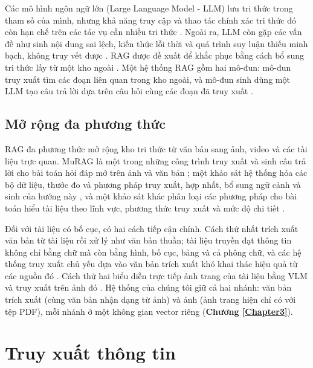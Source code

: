 Các mô hình ngôn ngữ lớn (Large Language Model - LLM) lưu tri thức trong tham số của mình, nhưng khả năng truy cập và thao tác chính xác tri thức đó còn hạn chế trên các tác vụ cần nhiều tri thức \cite{lewis2020rag}. Ngoài ra, LLM còn gặp các vấn đề như sinh nội dung sai lệch, kiến thức lỗi thời và quá trình suy luận thiếu minh bạch, không truy vết được \cite{gao2023ragsurvey}. RAG được đề xuất để khắc phục bằng cách bổ sung tri thức lấy từ một kho ngoài \cite{lewis2020rag, gao2023ragsurvey}. Một hệ thống RAG gồm hai mô-đun: mô-đun truy xuất tìm các đoạn liên quan trong kho ngoài, và mô-đun sinh dùng một LLM tạo câu trả lời dựa trên câu hỏi cùng các đoạn đã truy xuất \cite{es2024ragas}.

\subsection{Mở rộng đa phương thức}

RAG đa phương thức mở rộng kho tri thức từ văn bản sang ảnh, video và các tài liệu trực quan. MuRAG là một trong những công trình truy xuất và sinh câu trả lời cho bài toán hỏi đáp mở trên ảnh và văn bản \cite{chen2022murag}; một khảo sát hệ thống hóa các bộ dữ liệu, thước đo và phương pháp truy xuất, hợp nhất, bổ sung ngữ cảnh và sinh của hướng này \cite{abootorabi2025ask}, và một khảo sát khác phân loại các phương pháp cho bài toán hiểu tài liệu theo lĩnh vực, phương thức truy xuất và mức độ chi tiết \cite{gao2026scaling}.

\bigbreak\noindent
Đối với tài liệu có bố cục, có hai cách tiếp cận chính. Cách thứ nhất trích xuất văn bản từ tài liệu rồi xử lý như văn bản thuần; tài liệu truyền đạt thông tin không chỉ bằng chữ mà còn bằng hình, bố cục, bảng và cả phông chữ, và các hệ thống truy xuất chủ yếu dựa vào văn bản trích xuất khó khai thác hiệu quả từ các nguồn đó \cite{faysse2025colpali}. Cách thứ hai biểu diễn trực tiếp ảnh trang của tài liệu bằng VLM và truy xuất trên ảnh đó \cite{faysse2025colpali, yu2025visrag, tanaka2025vdocrag}. Hệ thống của chúng tôi giữ cả hai nhánh: văn bản trích xuất (cùng văn bản nhận dạng từ ảnh) và ảnh (ảnh trang hiện chỉ có với tệp PDF), mỗi nhánh ở một không gian vector riêng (\textbf{Chương \ref{Chapter3}}).


\section{Truy xuất thông tin}

